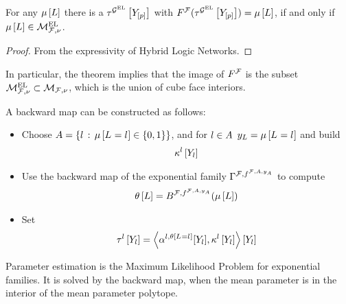 \begin{theorem}
    For any $\mu\left[L\right]$ there is a $\tau^{\mathcal{G}^{\mathrm{EL}}}\left[Y_{[p]}\right]$ with $F^{\mathcal{F}}(\tau^{\mathcal{G}^{\mathrm{EL}}}\left[Y_{[p]}\right])=\mu\left[L\right]$, if and only if $\mu\left[L\right]\in\mathcal{M}^{\mathrm{EL}}_{\mathcal{F},\nu}$.
\end{theorem}
\begin{proof}
    From the expressivity of Hybrid Logic Networks.
\end{proof}

In particular, the theorem implies that the image of $F^{\mathcal{F}}$ is the subset $\mathcal{M}^{\mathrm{EL}}_{\mathcal{F},\nu}\subset\mathcal{M}_{\mathcal{F},\nu}$, which is the union of cube face interiors.

A backward map can be constructed as follows:
\begin{itemize}
    \item Choose $A=\{l\,:\,\mu\left[L_{}=l_{}\right]\in\{0,1\}\}$, and for $l\in A$ $y_{L}=\mu\left[L_{}=l_{}\right]$ and build
        \begin{align*}
            \kappa^{l}\left[Y_{l}\right]
        \end{align*}
    \item Use the backward map of the exponential family $\Gamma^{\mathcal{F},f^{\mathcal{F},A,y_{A}}}$ to compute
        \begin{align*}
            \theta\left[L\right] = B^{\mathcal{F},f^{\mathcal{F},A,y_{A}}}(\mu\left[L\right])
        \end{align*}
    \item Set
        \begin{align*}
            \tau^{l}\left[Y_{l}\right] = \left\langle \alpha^{l,\theta\left[L_{}=l_{}\right]}[Y_{l}],\kappa^{l}\left[Y_{l}\right]\right\rangle \left[ Y_{l} \right]
        \end{align*}
\end{itemize}





\label{sec:alternatingParEstMLN}

Parameter estimation is the Maximum Likelihood Problem for exponential families.
It is solved by the backward map, when the mean parameter is in the interior of the mean parameter polytope.

\subsubsect{\MarkovLogicNetworks{}}


